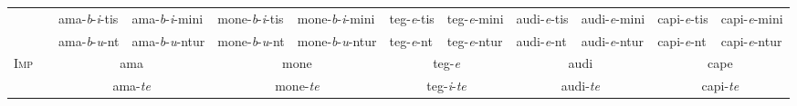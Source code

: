 \documentclass[12pt,a4paper]{article}
\begin{document}
\begin{center}
{{\begin{tabular}{ c | c | l l | l l | l l | l l | l l }
 & & ama-\emph{b}-\emph{i}-tis & ama-\emph{b}-\emph{i}-mini & mone-\emph{b}-\emph{i}-tis & mone-\emph{b}-\emph{i}-mini & teg-\emph{e}-tis & teg-\emph{e}-mini & audi-\emph{e}-tis & audi-\emph{e}-mini & capi-\emph{e}-tis & capi-\emph{e}-mini \\
 & & ama-\emph{b}-\emph{u}-nt  & ama-\emph{b}-\emph{u}-ntur & mone-\emph{b}-\emph{u}-nt  & mone-\emph{b}-\emph{u}-ntur & teg-\emph{e}-nt  & teg-\emph{e}-ntur & audi-\emph{e}-nt  & audi-\emph{e}-ntur & capi-\emph{e}-nt  & capi-\emph{e}-ntur \\
\midrule
\multirow{2}{*}{\textsc{Imp}} & & \multicolumn{2}{c|}{ama}           & \multicolumn{2}{c|}{mone}           & \multicolumn{2}{c|}{teg-\emph{e}}           & \multicolumn{2}{c|}{audi} & \multicolumn{2}{c}{cape} \\
                              & & \multicolumn{2}{c|}{ama-\emph{te}} & \multicolumn{2}{c|}{mone-\emph{te}} & \multicolumn{2}{c|}{teg-\emph{i}-\emph{te}} & \multicolumn{2}{c|}{audi-\emph{te}} & \multicolumn{2}{c}{capi-\emph{te}} \\
\bottomrule
\end{tabular}}}
\end{center}
\end{document}
